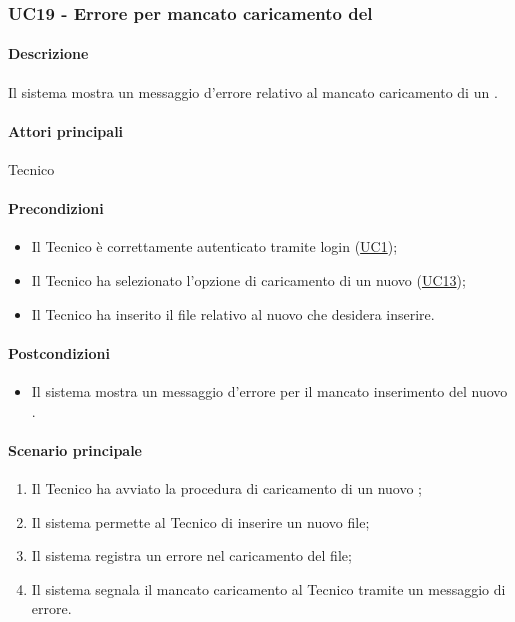 \subsubsection{UC19 - Errore per mancato caricamento del }\label{UC19}
\paragraph*{Descrizione}
Il sistema mostra un messaggio d’errore relativo al mancato caricamento di un .

\paragraph*{Attori principali}
Tecnico

\paragraph*{Precondizioni}
\begin{itemize}
  \item Il Tecnico è correttamente autenticato tramite login (\hyperref[UC1]{UC1});
  \item Il Tecnico ha selezionato l’opzione di caricamento di un nuovo  (\hyperref[UC13]{UC13});
  \item Il Tecnico ha inserito il file relativo al nuovo  che desidera inserire.  
\end{itemize}

\paragraph*{Postcondizioni}
\begin{itemize}
  \item Il sistema mostra un messaggio d’errore per il mancato inserimento del nuovo .
\end{itemize}

\paragraph*{Scenario principale}
\begin{enumerate}
  \item Il Tecnico ha avviato la procedura di caricamento di un nuovo ;
  \item Il sistema permette al Tecnico di inserire un nuovo file;
  \item Il sistema registra un errore nel caricamento del file;
  \item Il sistema segnala il mancato caricamento al Tecnico tramite un messaggio di errore.  
\end{enumerate}